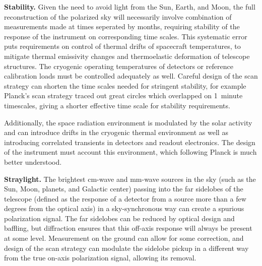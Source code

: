 \textbf{Stability.}  Given the need to avoid light from the Sun,
Earth, and Moon, the full reconstruction of the polarized sky will
necessarily involve combination of measurements made at times
seperated by months, requiring stability of the response of the
instrument on corresponding time scales.  This systematic error puts
requirements on control of thermal drifts of spacecraft temperatures, to
mitigate thermal emissivity changes and thermoelastic deformation of
telescope structures.  The cryogenic operating
temperatures of detectors or reference calibration loads must be controlled
adequately as well.
Careful design of the scan strategy can shorten the time
scales needed for stringent stability, for example
Planck's scan strategy traced out great circles which overlapped on
1~minute timescales, giving a shorter effective time scale for
stability 
requirements. 

Additionally, the space radiation environment is modulated by the solar activity and
can introduce drifts in the cryogenic thermal environment as well as
introducing correlated transients in detectors and readout
electronics.  The design of the instrument must account this
environment, which following Planck is much better understood.

\textbf{Straylight.}   The brightest cm-wave and mm-wave sources in
the sky (such as the Sun, Moon, planets, and Galactic center) passing
into the far sidelobes of the telescope (defined as the response of a
detector from a source more than a few degrees from the optical axis)
in a sky-synchronous way can create a spurious polarization signal.
The far sidelobes can be reduced by optical design and baffling, but diffraction ensures that this
off-axis response will always be present at some level.  Measurement on
the ground can allow for some correction, and design of the scan
strategy can modulate the sidelobe pickup in a different way from the
true on-axis polarization signal, allowing its removal.

